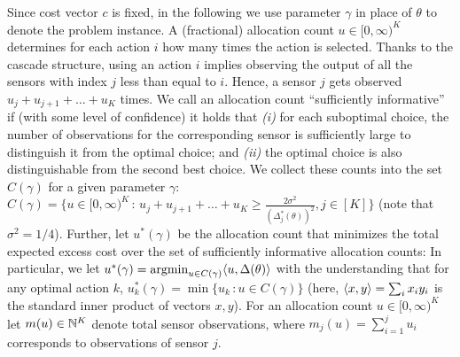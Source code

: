 Since cost vector $c$ is fixed, in the following we use parameter $\gamma$ in place of $\theta$ to denote the problem instance.
A (fractional) allocation count $u\in [0,\infty)^K$ determines for each action $i$ how many times the
action is selected.
Thanks to the cascade structure, using an action $i$ implies observing the output of all the sensors with index $j$ less than equal to $i$. Hence, a sensor $j$ gets observed $u_j+u_{j+1}+\dots+u_K$ times.
We call an allocation count ``sufficiently informative'' if (with some level of confidence)
it holds that {\em (i)} for each suboptimal choice, 
the number of observations for the corresponding sensor is sufficiently large to distinguish
it from the optimal choice; and  {\em (ii)}  the optimal choice is also distinguishable from the second best choice.
We collect these counts into the set $C(\gamma)$ for a given parameter $\gamma$:
$C(\gamma) = \{ u\in [0,\infty)^K\,:\, 
u_j+u_{j+1}+\dots+u_K
\ge \frac{2\sigma^2}{(\Delta_j^*(\theta))^2}, j\in [K] \}$
(note that $\sigma^2=1/4$).
Further, let $u^*(\gamma)$
be the allocation count that minimizes the total expected excess cost over the set of sufficiently informative allocation counts:
In particular,  we let $u^*(\gamma) = \operatorname{argmin}_{u\in C(\gamma)} \langle  u, \Delta(\theta)  \rangle$ 
with the understanding that for any optimal action $k$, $u_k^*(\gamma) = \min \{ u_k \,: u\in C(\gamma) \}$ (here, $\langle x,y \rangle = \sum_i x_i y_i$ is the standard inner product of vectors $x,y$).
For an allocation count $u\in [0,\infty)^K$ let $m(u)\in \mathbb{N}^K$ denote total sensor observations, where $m_j(u) = \sum_{i=1}^j u_i$ corresponds to observations of sensor $j$.


